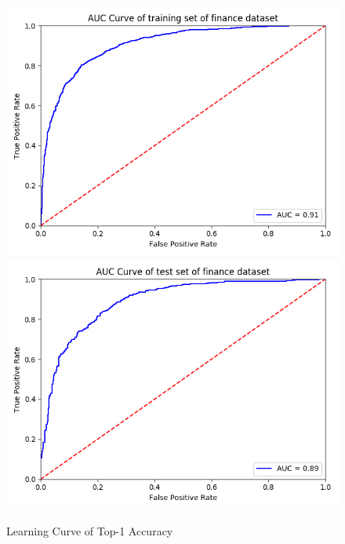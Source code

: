 \documentclass{article}
\begin{document}
\begin{figure}[h]
  \centering
  \includegraphics[scale=0.3]{finance_auc_train.png}
  \includegraphics[scale=0.3]{finance_auc_test.png}
  \caption{Learning Curve of Top-1 Accuracy}
\end{figure}

\pagebreak
\end{document}
